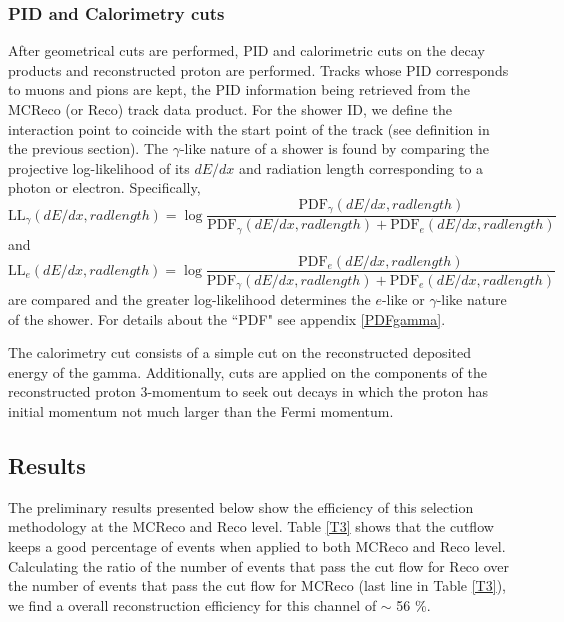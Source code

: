 \documentclass[a4paper, 10pt]{article}
\begin{document}
\subsubsection{PID and Calorimetry cuts }
\label{ID}
After geometrical cuts are performed, PID and calorimetric cuts on the decay products and reconstructed proton are performed. Tracks whose PID corresponds to muons and pions are kept, the PID information being retrieved from the MCReco (or Reco) track data product. For the shower ID, we define the interaction point to coincide with the start point of the track (see definition in the previous section). The $\gamma$-like nature of a shower is found by comparing the projective log-likelihood of its $dE/dx$ and radiation length corresponding to a photon or electron.
Specifically, 
\[\text{LL}_{\gamma}(dE/dx, rad length) = \log \frac{ \text{PDF}_{\gamma}(dE/dx, rad length) }{ \text{PDF}_{\gamma}(dE/dx, rad length) + \text{PDF}_{e}(dE/dx, rad length) }\]
and
\[\text{LL}_{e}(dE/dx, rad length) = \log \frac{ \text{PDF}_{e}(dE/dx, rad length) }{ \text{PDF}_{\gamma}(dE/dx, rad length) + \text{PDF}_{e}(dE/dx, rad length) }\]
are compared and the greater log-likelihood determines the $e$-like or $\gamma$-like nature of the shower. For details about the ``PDF"  see appendix \ref{PDFgamma}.

The calorimetry cut consists of a simple cut on the reconstructed deposited energy of the gamma. Additionally, cuts are applied on the components of the reconstructed proton 3-momentum to seek out decays in which the proton has initial momentum not much larger than the Fermi momentum.

\subsection{Results}

The preliminary results presented below show the efficiency of this selection methodology at the MCReco and Reco level. 
Table \ref{T3} shows that the cutflow keeps a good percentage of events when applied to both MCReco and Reco level.  Calculating the ratio of the number of events that pass the cut flow for Reco over the number of events that pass the cut flow for MCReco (last line in Table \ref{T3}), we find a overall reconstruction efficiency for this channel of $\sim$ 56 \%.
\end{document}
